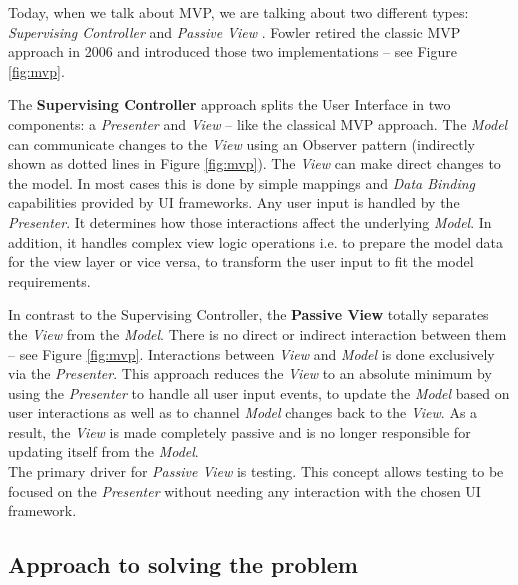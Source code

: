 Today, when we talk about MVP, we are talking about two different types: \emph{Supervising Controller} \cite{FowlerSupervisingController} and \emph{Passive View} \cite{FowlerPassiveView}. Fowler retired the classic MVP approach in 2006 \cite{FowlerMvpRetirementNote} and introduced those two implementations -- see Figure \ref{fig:mvp}.

The \textbf{Supervising Controller} approach splits the User Interface in two components: a \emph{Presenter} and \emph{View} – like the classical MVP approach. The \emph{Model} can communicate changes to the \emph{View} using an Observer pattern (indirectly shown as dotted lines in Figure \ref{fig:mvp}). The \emph{View} can make direct changes to the model. In most cases this is done by simple mappings and \emph{Data Binding} capabilities provided by UI frameworks. Any user input is handled by the \emph{Presenter}. It determines how those interactions affect the underlying \emph{Model}. In addition, it handles complex view logic operations i.e. to prepare the model data for the view layer or vice versa, to transform the user input to fit the model requirements.

In contrast to the Supervising Controller, the \textbf{Passive View} totally separates the \emph{View} from the \emph{Model}. There is no direct or indirect interaction between them -- see Figure \ref{fig:mvp}. Interactions between \emph{View} and \emph{Model} is done exclusively via the \emph{Presenter}. This approach reduces the \emph{View} to an absolute minimum by using the \emph{Presenter} to handle all user input events, to update the \emph{Model} based on user interactions as well as to channel \emph{Model} changes back to the \emph{View}. As a result, the \emph{View} is made completely passive and is no longer responsible for updating itself from the \emph{Model}.\\
The primary driver for \emph{Passive View} is testing. This concept allows testing to be focused on the \emph{Presenter} without needing any interaction with the chosen UI framework.


\subsection{Approach to solving the problem}